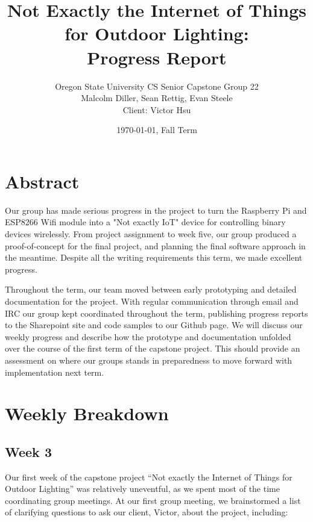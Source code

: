 \documentclass[letterpaper,10pt]{article}
\title{Not Exactly the Internet of Things for Outdoor Lighting:\\Progress Report}
\author{Oregon State University CS Senior Capstone Group 22\\
Malcolm Diller, Sean Rettig, Evan Steele\\
Client: Victor Hsu}
\date{\today, Fall Term}
\begin{document}
\maketitle

\section{Abstract}

Our group has made serious progress in the project to turn the Raspberry Pi and
ESP8266 Wifi module into a "Not exactly IoT" device for controlling binary
devices wirelessly. From project assignment to week five, our group produced a
proof-of-concept for the final project, and planning the final software
approach in the meantime. Despite all the writing requirements this term, we
made excellent progress.

Throughout the term, our team moved between early prototyping and detailed
documentation for the project. With regular communication through email and IRC
our group kept coordinated throughout the term, publishing progress reports to
the Sharepoint site and code samples to our Github page. We will discuss our
weekly progress and describe how the prototype and documentation unfolded over
the course of the first term of the capstone project. This should provide an
assessment on where our groups stands in preparedness to move forward with
implementation next term.

\pagebreak

\section{Weekly Breakdown}

\subsection{Week 3}

Our first week of the capstone project ``Not exactly the Internet of Things for
Outdoor Lighting'' was relatively uneventful, as we spent most of the time
coordinating group meetings.  At our first group meeting, we brainstormed a
list of clarifying questions to ask our client, Victor, about the project,
including:
\end{document}
